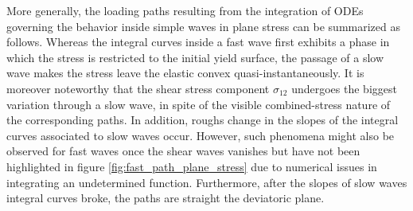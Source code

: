 More generally, the loading paths resulting from the integration of ODEs governing the behavior inside simple waves in plane stress can be summarized as follows.
Whereas the integral curves inside a fast wave first exhibits a phase in which the stress is restricted to the initial yield surface, the passage of a slow wave makes the stress leave the elastic convex quasi-instantaneously.
It is moreover noteworthy that the shear stress component $\sigma_{12}$ undergoes the biggest variation through a slow wave, in spite of the visible combined-stress nature of the corresponding paths.
In addition, roughs change in the slopes of the integral curves associated to slow waves occur.
However, such phenomena might also be observed for fast waves once the shear waves vanishes but have not been highlighted in figure \ref{fig:fast_path_plane_stress} due to numerical issues in integrating an undetermined function.
Furthermore, after the slopes of slow waves integral curves broke, the paths are straight the deviatoric plane.

